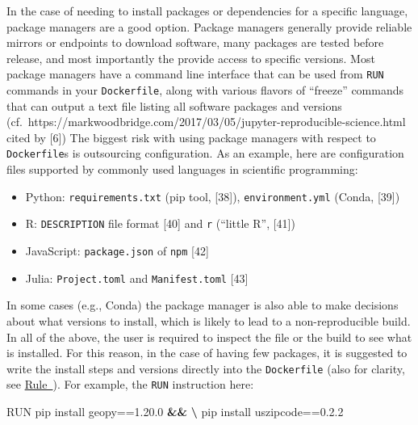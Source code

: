 \documentclass[10pt,letterpaper]{article}
\newenvironment{Shaded}{\begin{snugshade}}{\end{snugshade}}
\newcommand{\ExtensionTok}[1]{#1}
\newcommand{\KeywordTok}[1]{\textcolor[rgb]{0.13,0.29,0.53}{\textbf{#1}}}
\newcommand{\NormalTok}[1]{#1}
\providecommand{\tightlist}{%
  \setlength{\itemsep}{0pt}\setlength{\parskip}{0pt}}
\begin{document}
In the case of needing to install packages or dependencies for a
specific language, package managers are a good option. Package managers
generally provide reliable mirrors or endpoints to download software,
many packages are tested before release, and most importantly the
provide access to specific versions. Most package managers have a
command line interface that can be used from \texttt{RUN} commands in
your \texttt{Dockerfile}, along with various flavors of ``freeze''
commands that can output a text file listing all software packages and
versions
(cf.~https://markwoodbridge.com/2017/03/05/jupyter-reproducible-science.html
cited by {[}6{]}) The biggest risk with using package managers with
respect to \texttt{Dockerfile}s is outsourcing configuration. As an
example, here are configuration files supported by commonly used
languages in scientific programming:

\begin{itemize}
\tightlist
\item
  Python: \texttt{requirements.txt} (pip tool, {[}38{]}),
  \texttt{environment.yml} (Conda, {[}39{]})
\item
  R: \texttt{DESCRIPTION} file format {[}40{]} and \texttt{r} (``little
  R'', {[}41{]})
\item
  JavaScript: \texttt{package.json} of \texttt{npm} {[}42{]}
\item
  Julia: \texttt{Project.toml} and \texttt{Manifest.toml} {[}43{]}
\end{itemize}

In some cases (e.g., Conda) the package manager is also able to make
decisions about what versions to install, which is likely to lead to a
non-reproducible build. In all of the above, the user is required to
inspect the file or the build to see what is installed. For this reason,
in the case of having few packages, it is suggested to write the install
steps and versions directly into the \texttt{Dockerfile} (also for
clarity, see
\hyperref[{rule:formatting}]{Rule~}). For
example, the \texttt{RUN} instruction here:

\begin{Shaded}
\begin{Highlighting}[]
\ExtensionTok{RUN}\NormalTok{ pip install geopy==1.20.0 }\KeywordTok{&&} \KeywordTok{\textbackslash{}}
    \ExtensionTok{pip}\NormalTok{ install uszipcode==0.2.2}
\end{Highlighting}
\end{Shaded}
\end{document}
